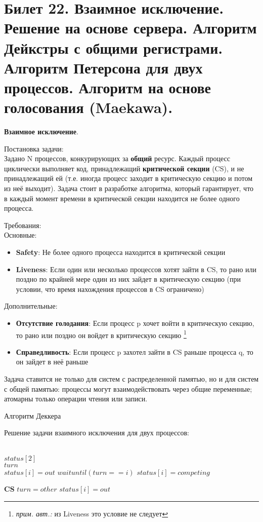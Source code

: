 \newpage
\section {Билет 22. Взаимное исключение. Решение на основе сервера. Алгоритм Дейкстры с общими регистрами. Алгоритм Петерсона для двух процессов. Алгоритм на основе голосования (Maekawa).}
\textbf{Взаимное исключение}.

Постановка задачи: \\
Задано N процессов, конкурирующих за \textbf{общий} ресурс. Каждый процесс циклически выполняет код, принадлежащий \textbf{критической секции} (CS), и не принадлежащий ей (т.е. иногда процесс заходит в критическую секцию и потом из неё выходит).
Задача стоит в разработке алгоритма, который гарантирует, что в каждый момент времени в критической секции находится не более одного процесса.

Требования: \\
Основные:
\begin{itemize}
\item \textbf{Safety}: Не более одного процесса находится в критической секции
\item \textbf{Liveness}: Если один или несколько процессов хотят зайти в CS, то рано или поздно по крайней мере один из них зайдет в критическую секцию (при условии, что время нахождения процессов в CS ограничено)
\end{itemize}
Дополнительные:
\begin{itemize}
\item \textbf{Отсутствие голодания}: Если процесс p хочет войти в критическую секцию, то рано или поздно он войдет в критическую секцию \footnote{\textit{прим. авт.:} из Liveness это условие не следует} 
\item \textbf{Справедливость}: Если процесс p захотел зайти в CS раньше процесса q, то он зайдет в неё раньше
\end{itemize}

Задача ставится не только для систем с распределенной памятью, но и для систем с общей памятью: процессы могут взаимодействовать через общие переменные; атомарны только операции чтения или записи.

\begin{algorithm}
\caption{Алгоритм Деккера}
Решение задачи взаимного исключения для двух процессов: 
\label{algDekker}
\begin{algorithmic}
\Ensure \\$status[2]$ \\ 
$turn$ \\ 
    \State $status[i] = out$
    \State $wait until (turn == i)$
    \State $status[i] = competing$
  \EndIf
\EndWhile

\State \textbf{CS}
\State $turn = other$
\State $status[i] = out$
\end{algorithmic}
\end{algorithm}


